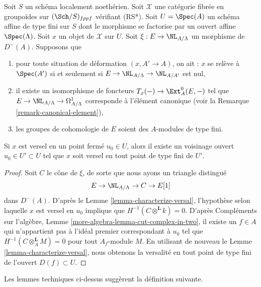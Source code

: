 \begin{lemma}
\label{lemma-openness}
Soit $S$ un schéma localement noethérien. Soit $\mathcal{X}$ une catégorie
fibrée en groupoïdes sur $(\Sch/S)_{fppf}$ vérifiant (RS*).
Soit $U = \Spec(A)$ un schéma affine de type fini sur $S$ dont le morphisme se factorise
par un ouvert affine $\Spec(\Lambda)$. Soit $x$ un objet de $\mathcal{X}$
sur $U$. Soit $\xi : E \to \NL_{A/\Lambda}$ un morphisme de $D^{-}(A)$.
Supposons que
\begin{enumerate}
\item[(i)] pour toute situation de déformation $(x, A' \to A)$, on ait :
$x$ se relève à $\Spec(A')$ si et seulement si
$E \to \NL_{A/\Lambda} \to \NL_{A/A'}$ est nul,
\item[(ii)] il existe un isomorphisme de foncteurs
$T_x(-) \to \Ext^0_A(E, -)$
tel que $E \to \NL_{A/\Lambda} \to \Omega^1_{A/\Lambda}$
corresponde à l'élément canonique (voir la
Remarque \ref{remark-canonical-element}),
\item[(iii)] les groupes de cohomologie de $E$ soient des $A$-modules de type fini.
\end{enumerate}
Si $x$ est versel en un point fermé $u_0 \in U$,
alors il existe un voisinage ouvert $u_0 \in U' \subset U$
tel que $x$ soit versel en tout point de type fini de $U'$.
\end{lemma}

\begin{proof}
Soit $C$ le cône de $\xi$, de sorte que nous ayons un triangle distingué
$$
E \to \NL_{A/\Lambda} \to C \to E[1]
$$
dans $D^{-}(A)$. D'après le Lemme \ref{lemma-characterize-versal},
l'hypothèse selon laquelle $x$ est versel en $u_0$ implique que
$H^{-1}(C \otimes^\mathbf{L} k) = 0$. D'après
Compléments sur l'algèbre, Lemme \ref{more-algebra-lemma-cut-complex-in-two},
il existe un $f \in A$ qui n'appartient pas à l'idéal premier correspondant à
$u_0$ tel que $H^{-1}(C \otimes^\mathbf{L}_A M) = 0$ pour
tout $A_f$-module $M$. En utilisant de nouveau le
Lemme \ref{lemma-characterize-versal},
nous obtenons la versalité en tout point de type fini de
l'ouvert $D(f) \subset U$.
\end{proof}

\noindent
Les lemmes techniques ci-dessus suggèrent la définition suivante.

